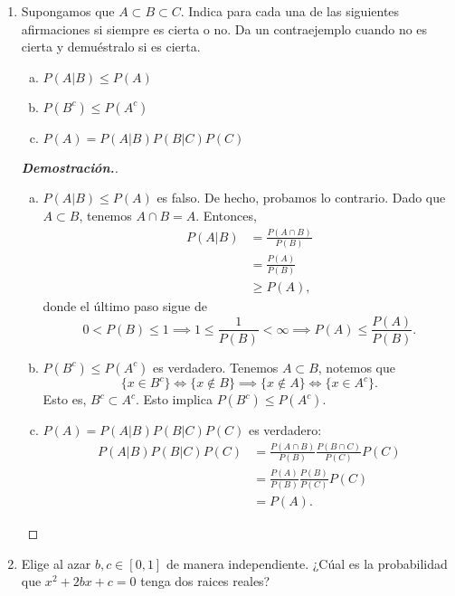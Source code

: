 \documentclass{article}
\begin{document}
\begin{enumerate}
		\item Supongamos que $A \subset B \subset C$. Indica para cada una de las siguientes afirmaciones si siempre es cierta o no. Da un contraejemplo cuando no es cierta y demu\'estralo si es cierta.
		\begin{enumerate}[a)]
			\item $P(A|B) \leq P(A)$
			\item $P(B^c) \leq P(A^c)$
			\item $P(A) = P(A|B) P(B|C) P(C)$
		\end{enumerate}
		
		\begin{mdframed}[
			linecolor=darkgray,
			backgroundcolor=pearl]
			\begin{proof}[\textbf{Demostraci\'on.}]
				\begin{enumerate}[a)]
					\item $P(A|B) \leq P(A)$ es falso. De hecho, probamos lo contrario. Dado que $A\subset B$, tenemos $A\cap B = A$. Entonces,
					\begin{align*}
						P(A|B) &= \frac{P(A\cap B)}{P(B)}\\
						&= \frac{P(A)}{P(B)}\\
						&\geq P(A),
					\end{align*}
					donde el \'ultimo paso sigue de $$0<P(B)\leq 1 \implies 1\leq \frac{1}{P(B)} < \infty\implies P(A)\leq \frac{P(A)}{P(B)}.$$
					\item $P(B^c) \leq P(A^c)$ es verdadero. Tenemos $A\subset B$, notemos que
					\[ \{x\in B^c\} \iff \{x\notin B\} \implies  \{x\notin A\} \iff \{x\in A^c\}. \]
					Esto es, $B^c \subset A^c$. Esto implica $P(B^c) \leq P(A^c)$.
					\item $P(A) = P(A|B) P(B|C) P(C)$ es verdadero:
					\begin{align*}
						P(A|B) P(B|C) P(C) &= \frac{P(A\cap B)}{P(B)} \frac{P(B\cap C)}{P(C)} P(C)\\
						&=  \frac{P(A)}{P(B)} \frac{P(B)}{P(C)} P(C)\\
						&= P(A).
					\end{align*}
				\end{enumerate}			
			\end{proof}
		\end{mdframed}
		\vspace{12pt}
		\item Elige al azar $b, c \in [0, 1]$ de manera independiente. ¿C\'ual es la probabilidad que $x^2 + 2bx + c = 0$ tenga dos raices reales?
		

\end{enumerate}
\end{document}
